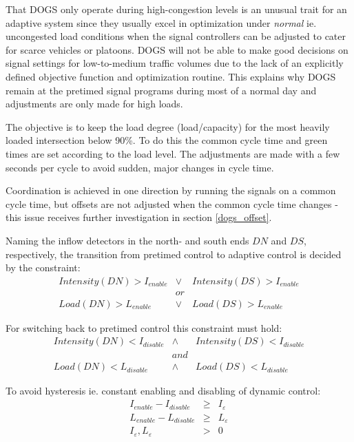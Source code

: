 That DOGS only operate during high-congestion levels is an unusual trait for an adaptive system since they usually excel in optimization under \textit{normal} ie. uncongested load conditions when the signal controllers can be adjusted to cater for scarce vehicles or platoons.
DOGS will not be able to make good decisions on signal settings for low-to-medium traffic volumes due to the lack of an explicitly defined objective function and optimization routine. This explains why DOGS remain at the pretimed signal programs during most of a normal day and adjustments are only made for high loads.

The objective is to keep the load degree (load/capacity) for the most heavily loaded intersection below 90\%.
To do this the common cycle time and green times are set according to the load level. The adjustments are made with a few seconds per cycle to avoid sudden, major changes in cycle time.

Coordination is achieved in one direction by running the signals on a common cycle time, but offsets are not adjusted when the common cycle time changes - this issue receives further investigation in section \ref{dogs_offset}.

Naming the inflow detectors in the north- and south ends $DN$ and $DS$, respectively, the transition from pretimed control to adaptive control is decided by the constraint:
\begin{eqnarray*}
Intensity(DN) > I_{enable} & \vee & Intensity(DS) > I_{enable} \\
& or & \\
Load(DN) > L_{enable} & \vee & Load(DS) > L_{enable}
\end{eqnarray*}

For switching back to pretimed control this constraint must hold:
\begin{eqnarray*}
Intensity(DN) < I_{disable} & \wedge & Intensity(DS) < I_{disable} \\
& and & \\
Load(DN) < L_{disable} & \wedge & Load(DS) < L_{disable}
\end{eqnarray*}

To avoid hysteresis ie. constant enabling and disabling of dynamic control:
\begin{eqnarray}
I_{enable} - I_{disable} & \geq & I_{\varepsilon} \label{eqn:hysteresis_intensity} \\ 
L_{enable} - L_{disable} & \geq & L_{\varepsilon} \label{eqn:hysteresis_load} \\
I_{\varepsilon},L_{\varepsilon} & > & 0 \label{eqn:hysteresis_limits}
\label{eqn:hysteresis}
\end{eqnarray}


